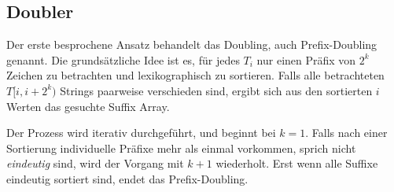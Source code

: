 \subsection{Doubler}
\label{sec:ansatz:doubler}
Der  erste besprochene Ansatz behandelt das Doubling, auch Prefix-Doubling genannt.
Die grundsätzliche Idee ist es, für jedes $T_i$ nur einen Präfix von $2^k$ Zeichen zu betrachten und lexikographisch zu sortieren. Falls alle betrachteten $T[i, i + 2^k)$ Strings paarweise verschieden sind, ergibt sich aus den sortierten $i$ Werten das gesuchte Suffix Array. 

Der Prozess wird iterativ durchgeführt, und beginnt bei $k = 1$. Falls nach einer Sortierung individuelle Präfixe mehr als einmal vorkommen, sprich nicht \textit{eindeutig} sind, wird der Vorgang mit $k + 1$ wiederholt. Erst wenn alle Suffixe eindeutig sortiert sind, endet das Prefix-Doubling.

